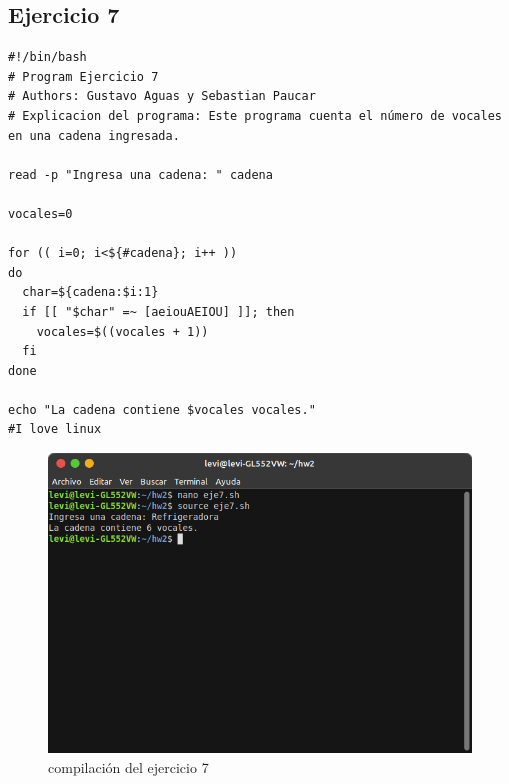 \documentclass[11pt,twoside]{book}
\begin{document}
\subsection{Ejercicio 7}
\begin{lstlisting}
#!/bin/bash
# Program Ejercicio 7
# Authors: Gustavo Aguas y Sebastian Paucar
# Explicacion del programa: Este programa cuenta el número de vocales en una cadena ingresada.

read -p "Ingresa una cadena: " cadena

vocales=0

for (( i=0; i<${#cadena}; i++ ))
do
  char=${cadena:$i:1}
  if [[ "$char" =~ [aeiouAEIOU] ]]; then
    vocales=$((vocales + 1))
  fi
done

echo "La cadena contiene $vocales vocales."
#I love linux
\end{lstlisting}
\begin{figure}[h]
    \centering
    \includegraphics[width=0.8\linewidth]{Tarea2/teje7.png}
    \caption{ compilación del ejercicio 7}
\end{figure}
\newpage
\end{document}
